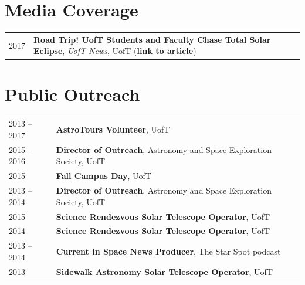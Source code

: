 \documentclass[10pt]{res} %
\begin{document}
\begin{resume}

\section{\Large Media Coverage}
\vspace{-5pt} %
\noindent\makebox[\linewidth]{\rule{\textwidth}{0.4pt}}
\vspace{-20pt} %

\begin{table}[h!]
\begin{tabularx}{\textwidth}{lX}
2017 & \textbf{Road Trip! UofT Students and Faculty Chase Total Solar Eclipse}, \textit{UofT News}, UofT (\href{https://www.utoronto.ca/news/road-trip-u-t-students-and-faculty-chase-total-solar-eclipse}{\textbf{link to article}})
\end{tabularx}
\end{table}


\newpage
\section{\Large Public Outreach}
\vspace{-5pt} %
\noindent\makebox[\linewidth]{\rule{\textwidth}{0.4pt}}
\vspace{-20pt} %

\begin{table}[h!]
\begin{tabularx}{\textwidth}{lX}
2013 -- 2017 & \textbf{AstroTours Volunteer}, UofT \\
2015 -- 2016 & \textbf{Director of Outreach}, Astronomy and Space Exploration Society, UofT \\
2015 & \textbf{Fall Campus Day}, UofT \\
2013 -- 2014 & \textbf{Director of Outreach}, Astronomy and Space Exploration Society, UofT \\
2015 & \textbf{Science Rendezvous Solar Telescope Operator}, UofT \\
2014 & \textbf{Science Rendezvous Solar Telescope Operator}, UofT \\
2013 -- 2014 & \textbf{Current in Space News Producer}, The Star Spot podcast \\
2013 & \textbf{Sidewalk Astronomy Solar Telescope Operator}, UofT
\end{tabularx}
\end{table}



\end{resume} 
\end{document}
